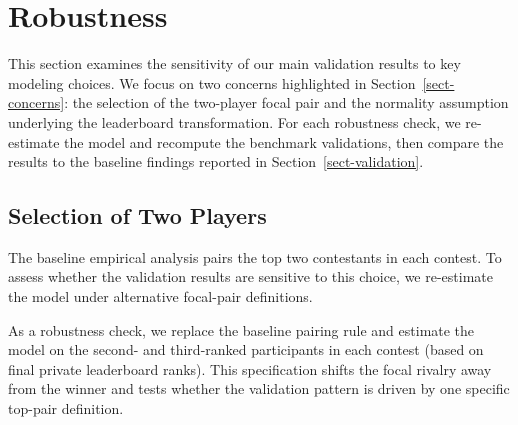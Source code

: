 \documentclass[mnsc]{informs3}
\begin{document}
\section{Robustness}

This section examines the sensitivity of our main validation results to key modeling choices.
We focus on two concerns highlighted in Section~\ref{sect-concerns}: the selection of the two-player focal pair and the normality assumption underlying the leaderboard transformation. For each robustness check, we re-estimate the model and recompute the benchmark validations, then compare the results to the baseline findings reported in Section~\ref{sect-validation}.

\subsection{Selection of Two Players}\label{sect-robust-2players}

The baseline empirical analysis pairs the top two contestants in each contest.
To assess whether the validation results are sensitive to this choice, we re-estimate the model under alternative focal-pair definitions.

As a robustness check, we replace the baseline pairing rule and estimate the model on the second- and third-ranked participants in each contest (based on final private leaderboard ranks).
This specification shifts the focal rivalry away from the winner and tests whether the validation pattern is driven by one specific top-pair definition.
\end{document}
